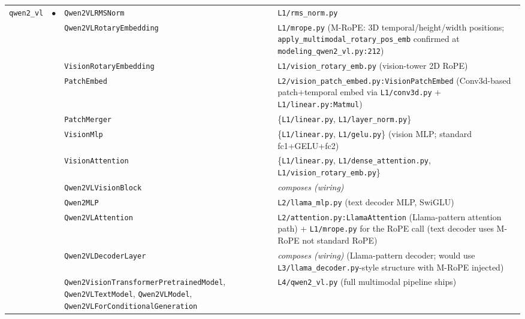 \documentclass[10pt]{article}
\begin{document}
{\begin{longtable}{@{}p{1.6cm} c p{4.0cm} p{14.5cm}@{}}
\multirow{12}{*}{\texttt{qwen2\_vl}} & \multirow{12}{*}{$\bullet$}
   & \texttt{Qwen2VLRMSNorm}          & \texttt{L1/rms\_norm.py} \\
&& \texttt{Qwen2VLRotaryEmbedding}    & \texttt{L1/mrope.py} (M-RoPE: 3D temporal/height/width positions; \texttt{apply\_multimodal\_rotary\_pos\_emb} confirmed at \texttt{modeling\_qwen2\_vl.py:212}) \\
&& \texttt{VisionRotaryEmbedding}     & \texttt{L1/vision\_rotary\_emb.py} (vision-tower 2D RoPE) \\
&& \texttt{PatchEmbed}                & \texttt{L2/vision\_patch\_embed.py:VisionPatchEmbed} (Conv3d-based patch+temporal embed via \texttt{L1/conv3d.py} + \texttt{L1/linear.py:Matmul}) \\
&& \texttt{PatchMerger}               & \{\texttt{L1/linear.py}, \texttt{L1/layer\_norm.py}\} \\
&& \texttt{VisionMlp}                 & \{\texttt{L1/linear.py}, \texttt{L1/gelu.py}\} (vision MLP; standard fc1+GELU+fc2) \\
&& \texttt{VisionAttention}           & \{\texttt{L1/linear.py}, \texttt{L1/dense\_attention.py}, \texttt{L1/vision\_rotary\_emb.py}\} \\
&& \texttt{Qwen2VLVisionBlock}        & \textit{composes (wiring)} \\
&& \texttt{Qwen2MLP}                  & \texttt{L2/llama\_mlp.py} (text decoder MLP, SwiGLU) \\
&& \texttt{Qwen2VLAttention}          & \texttt{L2/attention.py:LlamaAttention} (Llama-pattern attention path) + \texttt{L1/mrope.py} for the RoPE call (text decoder uses M-RoPE not standard RoPE) \\
&& \texttt{Qwen2VLDecoderLayer}       & \textit{composes (wiring)} (Llama-pattern decoder; would use \texttt{L3/llama\_decoder.py}-style structure with M-RoPE injected) \\
&& \texttt{Qwen2VisionTransformerPretrainedModel}, \texttt{Qwen2VLTextModel}, \texttt{Qwen2VLModel}, \texttt{Qwen2VLForConditionalGeneration} & \texttt{L4/qwen2\_vl.py} (full multimodal pipeline ships) \\
\midrule


\end{longtable}}
\end{document}
